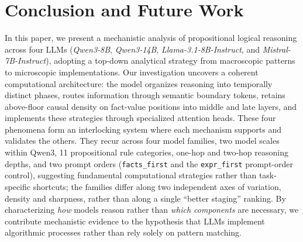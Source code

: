 \documentclass[11pt]{article}
\begin{document}
\section{Conclusion and Future Work}
In this paper, we present a mechanistic analysis of propositional logical reasoning across four LLMs (\textit{Qwen3-8B}, \textit{Qwen3-14B}, \textit{Llama-3.1-8B-Instruct}, and \textit{Mistral-7B-Instruct}), adopting a top-down analytical strategy
from
macroscopic patterns 
to
microscopic implementations.
Our investigation uncovers a coherent computational architecture: the model organizes reasoning into temporally distinct phases,
routes information through semantic boundary tokens,
retains above-floor causal density on fact-value positions into middle and late layers,
and implements these strategies through specialized attention heads.
These four phenomena form an interlocking system where each mechanism supports and validates the others. They recur across four model families, two model scales within Qwen3, 11 propositional rule categories, one-hop and two-hop reasoning depths, and two prompt orders (\texttt{facts\_first} and the \texttt{expr\_first} prompt-order control), suggesting fundamental computational strategies rather than task-specific shortcuts; the families differ along two independent axes of variation, density and sharpness, rather than along a single ``better staging'' ranking. By characterizing \textit{how} models reason rather than \textit{which components} are necessary, 
we contribute mechanistic evidence to the hypothesis that LLMs implement algorithmic processes rather than rely solely on pattern matching.
\end{document}
